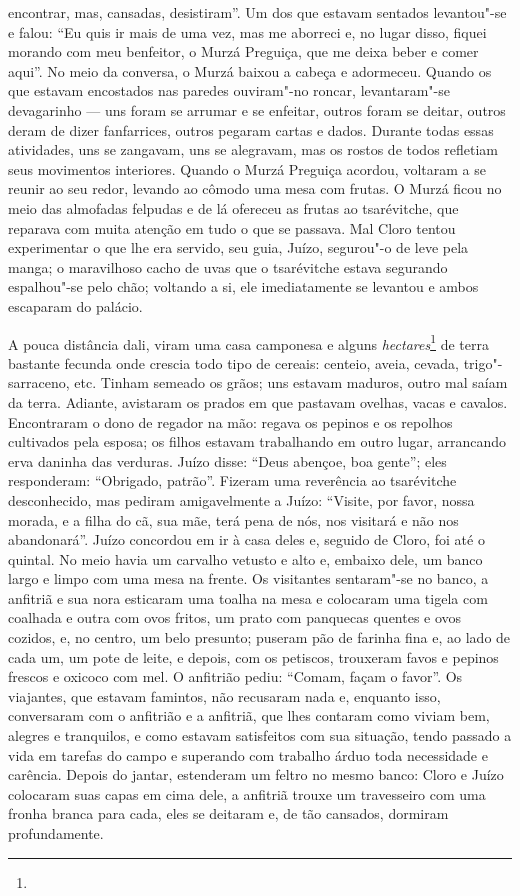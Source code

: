 encontrar, mas, cansadas, desistiram''. Um dos que estavam sentados
levantou"-se e falou: ``Eu quis ir mais de uma vez, mas me aborreci e, no
lugar disso, fiquei morando com meu benfeitor, o Murzá Preguiça, que me
deixa beber e comer aqui''. No meio da conversa, o Murzá baixou a cabeça
e adormeceu. Quando os que estavam encostados nas paredes ouviram"-no
roncar, levantaram"-se devagarinho --- uns foram se arrumar e se
enfeitar, outros foram se deitar, outros deram de dizer fanfarrices,
outros pegaram cartas e dados. Durante todas essas atividades, uns se
zangavam, uns se alegravam, mas os rostos de todos refletiam seus
movimentos interiores. Quando o Murzá Preguiça acordou, voltaram a se
reunir ao seu redor, levando ao cômodo uma mesa com frutas. O Murzá
ficou no meio das almofadas felpudas e de lá ofereceu as frutas ao
tsarévitche, que reparava com muita atenção em tudo o que se passava.
Mal Cloro tentou experimentar o que lhe era servido, seu guia, Juízo,
segurou"-o de leve pela manga; o maravilhoso cacho de uvas que o
tsarévitche estava segurando espalhou"-se pelo chão; voltando a si, ele
imediatamente se levantou e ambos escaparam do palácio.

A pouca distância dali, viram uma casa camponesa e alguns
\emph{hectares}\footnote{} de terra
bastante fecunda onde crescia todo tipo de cereais: centeio, aveia,
cevada, trigo"-sarraceno, etc. Tinham semeado os grãos; uns estavam
maduros, outro mal saíam da terra. Adiante, avistaram os prados em que
pastavam ovelhas, vacas e cavalos. Encontraram o dono de regador na mão:
regava os pepinos e os repolhos cultivados pela esposa; os filhos
estavam trabalhando em outro lugar, arrancando erva daninha das
verduras. Juízo disse: ``Deus abençoe, boa gente''; eles responderam:
``Obrigado, patrão''. Fizeram uma reverência ao tsarévitche
desconhecido, mas pediram amigavelmente a Juízo: ``Visite, por favor,
nossa morada, e a filha do cã, sua mãe, terá pena de nós, nos visitará e
não nos abandonará''. Juízo concordou em ir à casa deles e, seguido de
Cloro, foi até o quintal. No meio havia um carvalho vetusto e alto e,
embaixo dele, um banco largo e limpo com uma mesa na frente. Os
visitantes sentaram"-se no banco, a anfitriã e sua nora esticaram uma
toalha na mesa e colocaram uma tigela com coalhada e outra com ovos
fritos, um prato com panquecas quentes e ovos cozidos, e, no centro, um
belo presunto; puseram pão de farinha fina e, ao lado de cada um, um
pote de leite, e depois, com os petiscos, trouxeram favos e pepinos
frescos e oxicoco com mel. O anfitrião pediu: ``Comam, façam o favor''.
Os viajantes, que estavam famintos, não recusaram nada e, enquanto isso,
conversaram com o anfitrião e a anfitriã, que lhes contaram como viviam
bem, alegres e tranquilos, e como estavam satisfeitos com sua situação,
tendo passado a vida em tarefas do campo e superando com trabalho árduo
toda necessidade e carência. Depois do jantar, estenderam um feltro no
mesmo banco: Cloro e Juízo colocaram suas capas em cima dele, a anfitriã
trouxe um travesseiro com uma fronha branca para cada, eles se deitaram
e, de tão cansados, dormiram profundamente.

